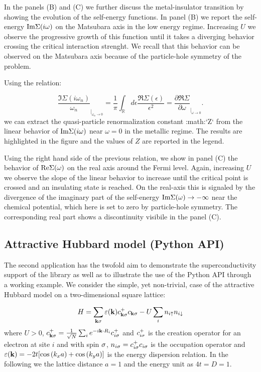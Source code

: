 In the panels (B) and (C) we further discuss the metal-insulator
transition by showing the evolution of the self-energy functions.
In panel (B) we report the self-energy ${\rm Im}\Sigma(i\omega)$
on the Matsubara axis in the low energy regime. Increasing $U$
we observe the progressive growth of this function until it takes a
diverging behavior crossing the critical interaction strenght. We
recall that this behavior can be observed on the Matsubara axis
because of the particle-hole symmetry of the problem.

Using the relation:

$$
   \frac{\Im\Sigma(i\omega_n)}{\omega_n}_{|_{\omega_n\rightarrow 0}}=
   \frac{1}{\pi}\int_{\mathbb R}d\epsilon \frac{\Re\Sigma(\epsilon)}{\epsilon^2}=
   \frac{\partial\Re\Sigma}{\partial\omega}_{|_{\omega\rightarrow 0}}.
$$
we can extract the quasi-particle renormalization constant :math:`Z`
from the linear behavior of ${\rm Im}\Sigma(i\omega)$ near
$\omega=0$ in the metallic regime. The results are highlighted
in the figure and the values of $Z$ are reported in the legend.

Using the right hand side of the previous relation, we show in
panel (C) the behavior of  ${\rm Re}\Sigma(\omega)$
on the real axis around the Fermi level. Again, increasing $U$
we observe the slope of the linear behavior to increase until the
critical point is crossed and an insulating state is reached. On the
real-axis this is signaled by the divergence of the imaginary part of
the self-energy   ${\rm Im}\Sigma(\omega) \rightarrow -\infty$
near the chemical potential, which here is set to zero by
particle-hole symmetry. The corresponding real part shows a
discontinuity visibile in the panel (C). 


\subsection{Attractive Hubbard model (Python API)}\label{SecExamplesAHM}
The second application has the twofold aim to demonstrate the
superconductivity support of the \NAME library as well as to
illustrate the use of the Python API through a working example.
We consider the simple, yet non-trivial, case of the attractive
Hubbard model on a two-dimensional square lattice:

$$
H = \sum_{{\bf k}\sigma} \varepsilon({\bf k})c^+_{{\bf k}\sigma}c_{{\bf k}\sigma} -U\sum_i n_{i\uparrow}n_{i\downarrow}
$$
where $U>0$, $c^+_{{\bf k}\sigma}=\tfrac{1}{\sqrt{N}}\sum_i e^{-i{\bf k}\cdot R_i} c^+_{i\sigma}$
and $c^+_{i\sigma}$ is the creation operator for an electron at site $i$
and with spin $\sigma$, $n_{i\sigma}=c^+_{i\sigma}c_{i\sigma}$ is the occupation
operator and $\varepsilon({\bf k})=-2t[\cos{(k_x a)}+ \cos{(k_y a)}]$ is the
energy dispersion relation. In the following we the lattice distance
$a=1$  and the energy unit as $4t=D=1$.

